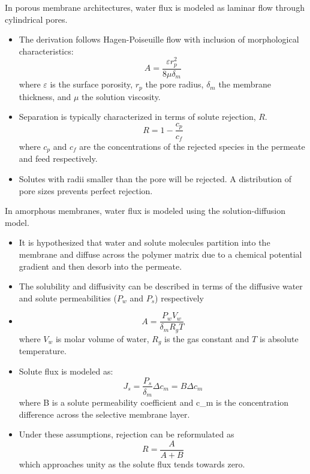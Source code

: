   In porous membrane architectures, water flux is modeled as laminar flow through 
  cylindrical pores.
  \begin{itemize}
    \item The derivation follows Hagen-Poiseuille flow with inclusion of morphological
    characteristics:
    \begin{equation}
      A = \frac{\varepsilon r_p^2}{8\mu\delta_m}
    \end{equation}
    where $\varepsilon$ is the surface porosity, $r_p$ the pore radius, $\delta_m$ the
    membrane thickness, and $\mu$ the solution viscosity.
    \item Separation is typically characterized in terms of solute rejection, $R$. 
    \begin{equation}
      R = 1 - \frac{c_p}{c_f}
    \end{equation}
    where $c_p$ and $c_f$ are the concentrations of the rejected species in
    the permeate and feed respectively.
    \item Solutes with radii smaller than the pore will be rejected. A distribution of 
    pore sizes prevents perfect rejection.
  \end{itemize}
  
  \noindent In amorphous membranes, water flux is modeled using the solution-diffusion 
  model.
  \begin{itemize}
    \item It is hypothesized that water and solute molecules partition into the
    membrane and diffuse across the polymer matrix due to a chemical potential
    gradient and then desorb into the permeate.
    \item The solubility and diffusivity can be described in terms of the 
    diffusive water and solute permeabilities ($P_w$ and $P_s$) respectively
    \item \begin{equation}
    A = \frac{P_wV_w}{\delta_mR_gT}
    \end{equation}
    where $V_w$ is molar volume of water, $R_g$ is the gas constant and $T$ is
    absolute temperature.
    \item Solute flux is modeled as:
    \begin{equation}
    J_s = \frac{P_s}{\delta_m}\Delta c_m = B\Delta c_m
    \end{equation}
    where B is a solute permeability coefficient and \Delta c_m is the concentration
    difference across the selective membrane layer.
    \item Under these assumptions, rejection can be reformulated as
    \begin{equation}
    R = \frac{A}{A + B}
    \end{equation}
    which approaches unity as the solute flux tends towards zero.
  \end{itemize}  
  
